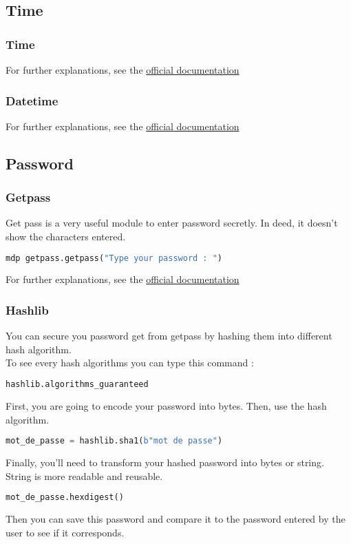 \documentclass[a4paper, 12pt, titlepage]{scrartcl} %
\begin{document}
\subsection{Time}
\subsubsection{Time}
For further explanations, see the \href{https://docs.python.org/3/library/time.html}{official documentation}

\subsubsection{Datetime}
For further explanations, see the \href{https://docs.python.org/3/library/datetime.html}{official documentation}

\subsection{Password}

\subsubsection{Getpass}
Get pass is a very useful module to enter password secretly. In deed, it doesn't show the characters entered.
\begin{lstlisting}[language=Python]
mdp getpass.getpass("Type your password : ")
\end{lstlisting}

For further explanations, see the \href{https://docs.python.org/3/library/getpass.html}{official documentation}

\subsubsection{Hashlib}
You can secure you password get from getpass by hashing them into different hash algorithm.\\
To see every hash algorithms you can type this command : 
\begin{lstlisting}[language=Python]
hashlib.algorithms_guaranteed
\end{lstlisting}
First, you are going to encode your password into bytes. Then, use the hash algorithm.
\begin{lstlisting}[language=Python]
mot_de_passe = hashlib.sha1(b"mot de passe")
\end{lstlisting}
Finally, you'll need to transform your hashed password into bytes or string. String is more readable and reusable.
\begin{lstlisting}[language=Python]
mot_de_passe.hexdigest()
\end{lstlisting}
Then you can save this password and compare it to the password entered by the user to see if it corresponds.
\end{document}
